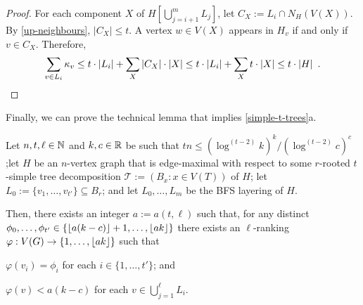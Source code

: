 \documentclass[kpfonts]{patmorin}
\theoremstyle{named}
\newcommand{\weirdref}[2]{\cref{#1}#2}
\begin{document}
\begin{proof}
    For each component $X$ of $H[\bigcup_{j=i+1}^m L_j]$, let $C_X:=L_i\cap N_H(V(X))$.  By \cref{up-neighbours}, $|C_X|\le t$. A vertex $w\in V(X)$ appears in $H_v$ if and only if $v\in C_X$.  Therefore,
    \[
        \sum_{v\in L_i} \kappa_v \le t\cdot|L_i| + \sum_{X}|C_X|\cdot|X| \le t\cdot|L_i| + \sum_{X}t\cdot|X|\le t\cdot|H| \enspace .  \qedhere
    \]
\end{proof}

Finally, we can prove the technical lemma that implies \weirdref{simple-t-trees}{a}.

\begin{lem}\label{t-tree-technical}
    Let $n,t,\ell\in\mathbb{N}$ and $k, c\in\mathbb{R}$ be such that $tn\le (\log^{(t-2)} k)^k/(\log^{(t-2)} c)^{c}$;let $H$ be an $n$-vertex graph that is edge-maximal with respect to some $r$-rooted $t$-simple tree decomposition $\mathcal{T}:=(B_x:x\in V(T))$ of $H$; let $L_0:=\{v_1,\ldots,v_{t'}\}\subseteq B_r$; and let $L_0,\ldots,L_m$ be the BFS layering of $H$.

    Then, there exists an integer $a:=a(t,\ell)$ such that, for any distinct $\phi_0,\ldots,\phi_{t'}\in \{{\lfloor a(k-c) \rfloor}+1,\ldots,{\lfloor ak \rfloor}\}$ there exists an $\ell$-ranking $\varphi:V(G)\to\{1,\ldots,{\lfloor ak \rfloor}\}$ such that
    \begin{compactenum}[(R1)]
        \item $\varphi(v_i)=\phi_i$ for each $i\in\{1,\ldots,t'\}$; and
        \item $\varphi(v)<a(k-c)$ for each $v\in\bigcup_{j=1}^{\ell} L_i$.
    \end{compactenum}
\end{lem}
\end{document}
